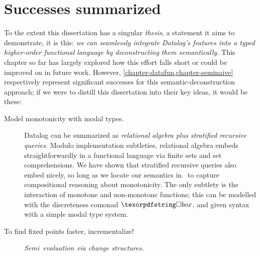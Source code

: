


\section{Successes summarized}

To the extent this dissertation has a singular \emph{thesis}, a statement it aims to demonstrate, it is this: \emph{we can seamlessly integrate Datalog's features into a typed higher-order functional language by deconstructing them semantically.}
%
This chapter so far has largely explored how this effort falls short or could be improved on in future work.
%
However, \cref{chapter-datafun,chapter-seminaive} respectively represent
significant successes for this semantic-deconstruction approach; if we were to
distill this dissertation into their key ideas, it would be these:



\begin{description}
\item[Model monotonicity with modal types.]
  Datalog can be summarized as \emph{relational algebra plus stratified
  recursive queries.} Modulo implementation subtleties, relational algebra
  embeds straightforwardly in a functional language via finite sets and set
  comprehensions. We have shown that stratified recursive queries also embed
  nicely, so long as we locate our semantics in \Poset\ to capture compositional
  reasoning about monotonicity.
  The only subtlety is the interaction of monotone and non-monotone functions;
  this can be modelled with the discreteness comonad $\iso$, and given syntax
  with a simple modal type system.

\item[{To find fixed points faster, incrementalize!}] \emph{Semi\naive\ evaluation via change structures.}
\end{description}
